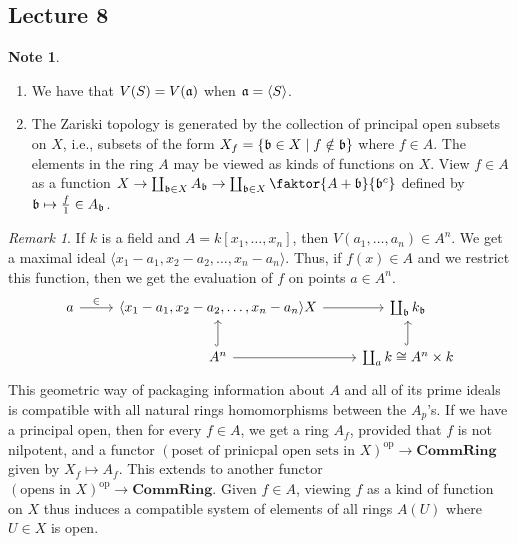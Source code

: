 \documentclass[10pt,letterpaper,cm]{nupset}
\theoremstyle{definition}
\newtheorem{note}[definition]{Note}
\theoremstyle{theorem}
\theoremstyle{remark}
\newtheorem{remark}[definition]{Remark}
\newcommand{\1}{\mathbf{1}}
\newcommand{\0}{\vec 0}
\DeclareMathOperator{\op}{op}
\begin{document}
\subsection{Lecture 8}

\begin{note} $ $
\begin{enumerate}
\item We have that $V(S) = V(\frak{a})$ when $\frak{a} = \langle S \rangle $.
\item The Zariski topology is generated by the collection of principal open subsets on $X$, i.e., subsets of the form $X_f= \{\frak{b} \in X \mid  f\notin \frak{b} \}$ where $f\in A$. The elements in the ring $A$ may be viewed as kinds of functions on $X$. View $f\in A$ as a function $X \to \coprod_{\frak{b} \in X} A_{\frak{b}} \to \coprod_{\frak{b} \in X} \faktor{A+{\frak{b}}}{\frak{b}^c}$ defined by $\frak{b} \mapsto \frac{f}{1} \in A_{\frak{b}}$.
\end{enumerate}
\end{note}

\begin{remark}
If $k$ is a field and $A = k[x_1, \ldots, x_n]$, then $V(a_1, \ldots, a_n) \in A^n$. We get a maximal ideal $\langle x_1 - a_1, x_2 -a_2, \ldots, x_n-a_n \rangle$. Thus, if $f(x) \in A$ and we restrict this function, then we get the evaluation of $f$ on points $a\in A^n$.
\[
\begin{tikzcd}
a \arrow[r, "\in"] & {\langle x_1 - a_1, x_2 -a_2, \ldots, x_n-a_n \rangle X} \arrow[r] & \coprod_{\frak{b}} k_{\frak{b}} \\
 & A^n \arrow[r] \arrow[u, hook] & \coprod_{a} k \cong A^n \times k \arrow[u, hook]
\end{tikzcd}
\] 
This geometric way of packaging information about $A$ and all of its prime ideals is compatible with all natural rings homomorphisms between the $A_p$'s. If we have  a principal open, then for every $f\in A$, we get a ring $A_f$, provided that $f$ is not nilpotent, and a functor $(\text{poset of prinicpal open sets in } X)^{\op} \to \mathbf{CommRing}$ given by $X_f \mapsto A_f$. This extends to another functor $(\text{opens in } X)^{\op} \to \mathbf{CommRing}$.  Given $f\in A$, viewing $f$ as a kind of function on $X$ thus induces a compatible system of elements of all rings $A(U)$ where $U\in X$ is open. 
\end{remark}
\end{document}
